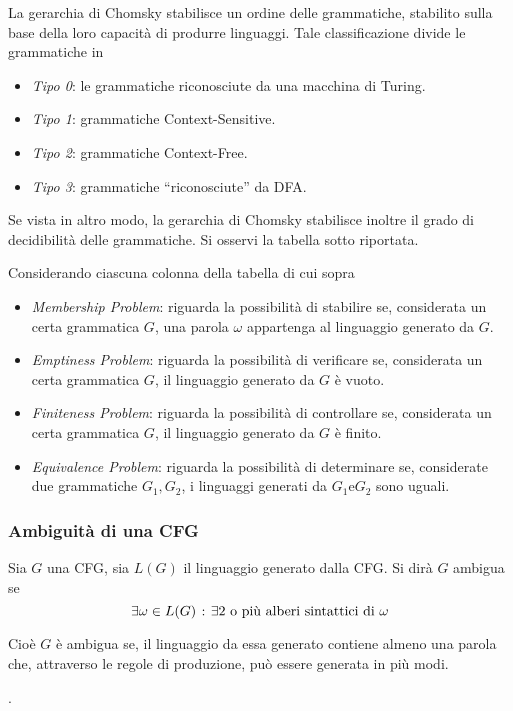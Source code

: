\documentclass{subfiles}
\begin{document}
La gerarchia di Chomsky stabilisce un ordine delle grammatiche, stabilito sulla base della loro capacità di produrre linguaggi.
Tale classificazione divide le grammatiche in
\begin{itemize}
    \item \emph{Tipo 0}: le grammatiche riconosciute da una macchina di Turing\footnotemark[1].
    \item \emph{Tipo 1}: grammatiche Context-Sensitive.
    \item \emph{Tipo 2}: grammatiche Context-Free.
    \item \emph{Tipo 3}: grammatiche ``riconosciute'' da DFA.
\end{itemize}

\noindent Se vista in altro modo, la gerarchia di Chomsky stabilisce inoltre il grado di decidibilità delle grammatiche.
Si osservi la tabella sotto riportata.


\noindent Considerando ciascuna colonna della tabella di cui sopra
\begin{itemize}
    \item \emph{Membership Problem}: riguarda la possibilità di stabilire se, considerata un certa grammatica \(G\),
          una parola \(\omega\) appartenga al linguaggio generato da \(G\).

    \item \emph{Emptiness Problem}: riguarda la possibilità di verificare se, considerata un certa grammatica \(G\), il linguaggio generato da \(G\) è vuoto.
    \item \emph{Finiteness Problem}: riguarda la possibilità di controllare se, considerata un certa grammatica \(G\), il linguaggio generato da \(G\) è finito.
    \item \emph{Equivalence Problem}: riguarda la possibilità di determinare se, considerate due grammatiche \(G_{1}, G_{2}\), i linguaggi generati da \(G_{1} \text{e} G_{2}\) sono uguali.
\end{itemize}

\subsubsection{Ambiguità di una CFG}
\begin{Definition*}
    Sia \(G\) una CFG, sia \(L(G)\) il linguaggio generato dalla CFG. Si dirà \(G\) ambigua se
    \[\exists \omega \in L(G) \such \exists 2 \text{o più alberi sintattici di} \omega\]
\end{Definition*}

\noindent Cioè \(G\) è ambigua se, il linguaggio da essa generato contiene almeno una parola che, attraverso le regole di produzione, può essere generata in più modi.

.
\clearpage
\end{document}
